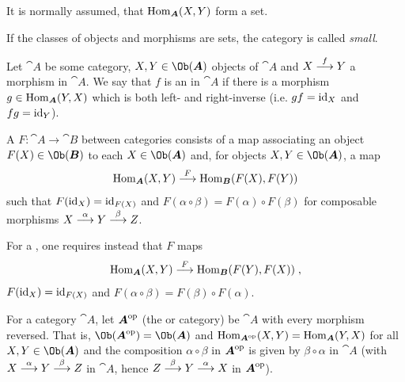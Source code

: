 \documentclass[a4paper,parskip=half,numbers=enddot, DIV=12]{scrreprt}
\begin{document}
	\begin{rem*}
		\begin{alphanumerate}
			\item It is normally assumed, that $\Hom_{\cat A}(X,Y)$ form a set.
			\item If the classes of objects and morphisms are sets, the category is called \emph{small}.
		\end{alphanumerate}
	\end{rem*}
	\begin{defi}
		Let ${\cat A}$ be some category, $X,Y\in\Ob({\cat A})$ objects of ${\cat A}$ and $X\morphism[f]Y$ a morphism in ${\cat A}$. We say that $f$ is an  in ${\cat A}$ if there is a morphism $g\in\Hom_{\cat A}(Y,X)$ which is both left- and right-inverse (i.e. $gf=\operatorname{id}_X$ and $fg=\operatorname{id}_Y$).
	\end{defi}
	\begin{defi}
		\begin{alphanumerate}
			\item A  $F\colon{\cat A}\to{\cat B}$ between categories consists of a map associating an object $F(X)\in\Ob({\cat B})$ to each $X\in\Ob({\cat A})$ and, for objects $X,Y\in\Ob({\cat A})$, a map 
			\begin{align*}
				\Hom_{\cat A}(X,Y)\morphism[F]\Hom_{\cat B}(F(X),F(Y))
			\end{align*}
			such that $F(\operatorname{id}_X)=\operatorname{id}_{F(X)}$ and $F(\alpha\circ\beta)=F(\alpha)\circ F(\beta)$ for composable morphisms $X\morphism[\alpha]Y\morphism[\beta]Z$. 
			\item For a , one requires instead that $F$ maps 
			\begin{align*}
				\Hom_{\cat A}(X,Y)\morphism[F]\Hom_{\cat B}(F(Y),F(X))\;,
			\end{align*}
			$F(\operatorname{id}_X)=\operatorname{id}_{F(X)}$ and $F(\alpha\circ\beta)=F(\beta)\circ F(\alpha)$.
		\end{alphanumerate}
	\end{defi}
	\begin{defi}\lbl{def:opCategory}
		For a category ${\cat A}$, let ${\cat A}^\op$ (the  or  category) be ${\cat A}$ with every morphism reversed. That is, $\Ob({\cat A}^\op)=\Ob({\cat A})$ and $\Hom_{{\cat A}^\op}(X,Y)=\Hom_{\cat A}(Y,X)$ for all $X,Y\in\Ob({\cat A})$ and the composition $\alpha\circ\beta$ in ${\cat A}^\op$ is given by $\beta\circ\alpha$ in ${\cat A}$ (with $X\morphism[\alpha]Y\morphism[\beta]Z$ in ${\cat A}$, hence $Z\morphism[\beta]Y\morphism[\alpha]X$ in ${\cat A}^\op$). 
	\end{defi}
\end{document}
